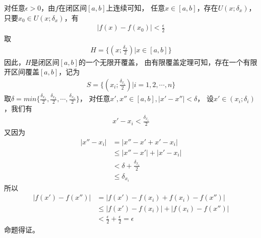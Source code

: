 \documentclass{article}
\begin{document}
对任意$\epsilon > 0$，由$f$在闭区间$[a, b]$上连续可知，
任意$x \in [a, b]$，存在$U(x; \delta_x)$，只要$x_0 \in U(x; \delta_x)$，有
\begin{align*}
  |f(x) - f(x_0)| < \frac{\epsilon}{2}
\end{align*}
取
\begin{align*}
  H = \{(x; \frac{\delta_{x}}{2})| x \in [a, b]\}
\end{align*}
因此，$H$是闭区间$[a, b]$的一个无限开覆盖，
由有限覆盖定理可知，存在一个有限开区间覆盖$[a, b]$，记为
\begin{align*}
  S = \{(x_i; \frac{\delta_{x_i}}{2})| i = 1, 2, \cdots, n\}
\end{align*}
取$\delta = min\{\frac{\delta_{x_1}}{2}, \frac{\delta_{x_2}}{2}, \cdots, \frac{\delta_{x_n}}{2}\}$，
对任意$x', x'' \in [a, b], |x' - x''| < \delta$，
设$x' \in (x_i; \delta_{i})$，我们有
\begin{align*}
  x' - x_i < \frac{\delta_{x_i}}{2}
\end{align*}
又因为
\begin{align*}
  |x'' - x_i| & = |x'' - x' + x' - x_i|           \\
              & \leq |x'' - x'| + |x' - x_i|      \\
              & < \delta + \frac{\delta_{x_i}}{2} \\
              & \leq \delta_{x_i}
\end{align*}
所以
\begin{align*}
  |f(x') - f(x'')|
   & = |f(x') - f(x_i) + f(x_i) - f(x'')|      \\
   & \leq |f(x') - f(x_i)| + |f(x_i) - f(x'')| \\
   & < \frac{\epsilon}{2} + \frac{\epsilon}{2} = \epsilon
\end{align*}
命题得证。
\end{document}

